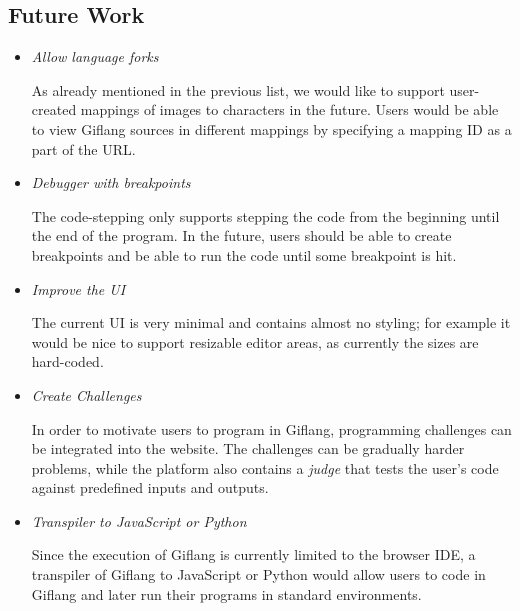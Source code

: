\subsection*{Future Work}
\begin{itemize}
   \item \emph{Allow language forks}

      As already mentioned in the previous list, we would like to support user-created mappings of images to characters in the future. Users would be able
      to view Giflang sources in different mappings by specifying a mapping ID as a part of the URL.

   \item \emph{Debugger with breakpoints}

      The code-stepping only supports stepping the code from the beginning until the end of the program. In the future, users should be able to create breakpoints
      and be able to run the code until some breakpoint is hit.

   \item \emph{Improve the UI}

      The current UI is very minimal and contains almost no styling; for example it would be nice to support resizable editor areas, as currently the sizes
      are hard-coded.
   \item \emph{Create Challenges} 

      In order to motivate users to program in Giflang, programming challenges can be integrated into the website. The challenges can be gradually harder problems,
      while the platform also contains a \emph{judge} that tests the user's code against predefined inputs and outputs.
   \item \emph{Transpiler to JavaScript or Python}

      Since the execution of Giflang is currently limited to the browser IDE, a transpiler of Giflang to JavaScript or Python would allow users to code in Giflang
      and later run their programs in standard environments. 
\end{itemize}
